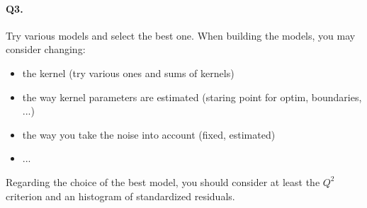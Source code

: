 \documentclass[12pt]{scrartcl}
\begin{document}
\paragraph{Q3.} Try various models and select the best one. When building the models, you may consider changing:
\begin{itemize}
   	\item the kernel (try various ones and sums of kernels)
   	\item the way kernel parameters are estimated (staring point for optim, boundaries, ...)
   	\item the way you take the noise into account (fixed, estimated)
   	\item ...
\end{itemize}   
Regarding the choice of the best model, you should consider at least the $Q^2$ criterion and an histogram of standardized residuals.
\end{document}
